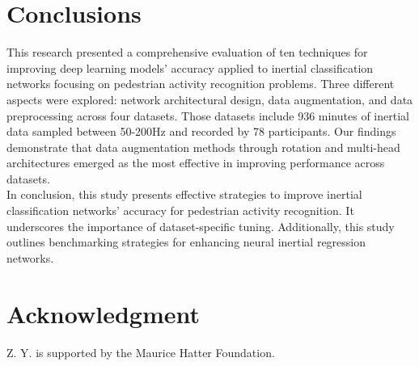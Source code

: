 \documentclass[journal]{IEEEtran}
\begin{document}
\section{Conclusions} \label{sec:conclusions}
\noindent 
This research presented a comprehensive evaluation of ten techniques for improving deep learning models' accuracy applied to inertial classification networks focusing on pedestrian activity recognition problems. Three different aspects were explored: network architectural design, data augmentation, and data preprocessing across four datasets. Those datasets include 936 minutes of inertial data sampled between 50-200Hz and recorded by 78 participants. Our findings demonstrate that data augmentation methods through rotation and multi-head architectures emerged as the most effective in improving performance across datasets. 
\\
In conclusion, this study presents effective strategies to improve inertial classification networks' accuracy for pedestrian activity recognition. It underscores the importance of dataset-specific tuning. Additionally, this study outlines benchmarking strategies for enhancing neural inertial regression networks.
%
\section*{Acknowledgment}
Z. Y. is supported by the Maurice Hatter Foundation.



\end{document}
